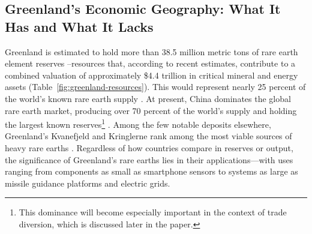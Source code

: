\documentclass{adonis}
\begin{document}
    \subsection*{Greenland’s Economic Geography: What It Has and What It Lacks}

    Greenland is estimated to hold more than 38.5 million metric tons of rare earth element reserves \citep{dempsey2019greenland}–resources that, according to recent estimates, contribute to a combined valuation of approximately \$4.4 trillion in critical mineral and energy assets (Table~\ref{fig:greenland-resources}). This would represent nearly 25 percent of the world’s known rare earth supply \citep{rosa2023mima, usgs2024mcs}. At present, China dominates the global rare earth market, producing over 70 percent of the world’s supply and holding the largest known reserves\footnote{This dominance will become especially important in the context of trade diversion, which is discussed later in the paper.} \citep{economic_times2025rare_earths}. Among the few notable deposits elsewhere, Greenland’s Kvanefjeld and Kringlerne rank among the most viable sources of heavy rare earths \citep{economic_times2025rare_earths}. Regardless of how countries compare in reserves or output, the significance of Greenland’s rare earths lies in their applications—with uses ranging from components as small as smartphone sensors to systems as large as missile guidance platforms and electric grids.
    
\end{document}

